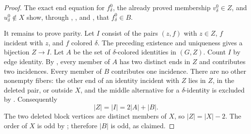 \begin{proof}
The exact end equation for $f^0_\delta$, the already proved membership
$v^0_\delta\in Z$, and $u^0_\delta\notin X$ show, through
, , and
, that $f^0_\delta\in B$.

It remains to prove parity.  Let $I$ consist of the pairs $(z,f)$ with
$z\in Z$, $f$ incident with $z$, and $f$ colored $\delta$.  The preceding
existence and uniqueness gives a bijection $Z\to I$.  Let $A$ be the set
of $\delta$-colored identities in $(G,Z)$.  Count
$I$ by edge identity.  By , every member of
$A$ has two distinct ends in $Z$ and contributes two incidences.  Every
member of $B$ contributes one incidence.  There are no other nonempty
fibers: the other end of an identity incident with $Z$ lies in $Z$, in
the deleted pair, or outside $X$, and the middle alternative for a
$\delta$-identity is excluded by .
Consequently
\[
 |Z|=|I|=2|A|+|B|.
\]
The two deleted block vertices are distinct members of $X$, so
$|Z|=|X|-2$.  The order of $X$ is odd by
; therefore $|B|$ is odd, as claimed.
\end{proof}

